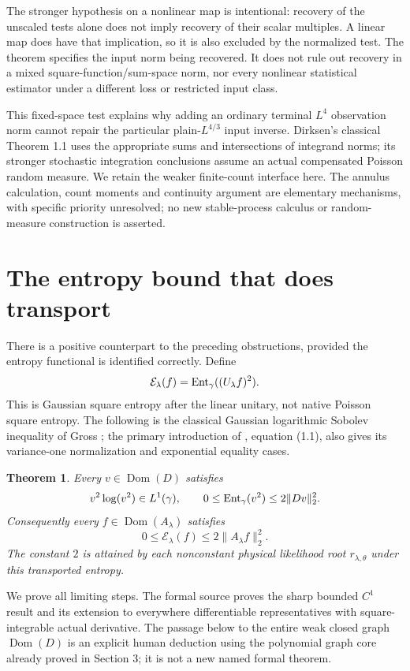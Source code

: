 \documentclass[11pt]{article}
\newtheorem{theorem}{Theorem}[section]
\newcommand{\Dom}{\operatorname{Dom}}
\begin{document}
The stronger hypothesis on a nonlinear map is intentional: recovery
of the unscaled tests alone does not imply recovery of their scalar
multiples. A linear map does have that implication, so it is also
excluded by the normalized test. The theorem specifies the input
norm being recovered. It does not rule out recovery in a mixed
square-function/sum-space norm, nor every nonlinear statistical
estimator under a different loss or restricted input class.

This fixed-space test explains why adding an ordinary terminal $L^4$
observation norm cannot repair the particular plain-$L^{4/3}$ input
inverse. Dirksen's classical Theorem 1.1 \cite{Dirksen} uses the
appropriate sums and intersections of integrand norms; its stronger
stochastic integration conclusions assume an actual compensated
Poisson random measure. We retain the weaker finite-count interface
here. The annulus calculation, count moments and continuity argument
are elementary mechanisms, with specific priority unresolved; no new
stable-process calculus or random-measure construction is asserted.

\section{The entropy bound that does transport}
There is a positive counterpart to the preceding obstructions, provided
the entropy functional is identified correctly. Define
\[
 \mathcal E_\lambda(f)=\operatorname{Ent}_\gamma((U_\lambda f)^2).
\]
This is Gaussian square entropy after the linear unitary, not native
Poisson square entropy. The following is the classical Gaussian
logarithmic Sobolev inequality of Gross \cite{Gross}; the primary
introduction of \cite{BGRS}, equation (1.1), also gives its
variance-one normalization and exponential equality cases.

\begin{theorem}\label{thm:transport-entropy}
Every $v\in\Dom(D)$ satisfies
\[
 v^2\log(v^2)\in L^1(\gamma),\qquad
 0\leq\operatorname{Ent}_\gamma(v^2)\leq2\|Dv\|_2^2.
\]
Consequently every $f\in\Dom(A_\lambda)$ satisfies
\[
 0\leq\mathcal E_\lambda(f)\leq2\|A_\lambda f\|_2^2.
\]
The constant $2$ is attained by each nonconstant physical likelihood
root $r_{\lambda,\theta}$ under this transported entropy.
\end{theorem}

We prove all limiting steps. The formal source proves the sharp
bounded $C^1$ result and its extension to everywhere differentiable
representatives with square-integrable actual derivative. The passage
below to the entire weak closed graph $\Dom(D)$ is an explicit human
deduction using the polynomial graph core already proved in Section 3;
it is not a new named formal theorem.
\end{document}
